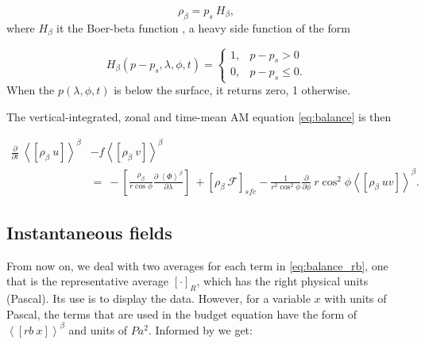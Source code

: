 \documentclass[11pt]{article}
\numberwithin{equation}{section}
\newcommand{\beq}{\begin{equation}}
\newcommand{\eeq}{\end{equation}}
\newcommand{\la}{\langle}
\newcommand{\ra}{\rangle}
\newcommand{\lara}[1]{\left\la{#1}\right\ra}
\newcommand{\cphi}{\cos \phi}
\newcommand{\rb}{\rho_\beta}
\begin{document}
$$\rb = p_s ~H_\beta,$$ 
where $H_\beta$ it the Boer-beta function \citep{Boer1982}, a heavy side function of the form 

\beq
H_\beta(p -p_s, \lambda, \phi, t)= 
    \begin{cases}  
      1, & p -p_s >  0 \\
      0, & p -p_s \leq 0.
    \end{cases}
\eeq
When the $p(\lambda, \phi, t)$ is below the surface, it returns zero, 1 otherwise.\par


The vertical-integrated, zonal and time-mean AM equation \eqref{eq:balance} is then 

\begin{align} \label{eq:balance_rb}
\frac{\partial}{\partial t}  ~ \lara{[\rb~u]}^\beta &- f \lara{ [\rb~v]}^\beta  \nonumber  \\
  &= ~ - \left[\frac{\rb }{r \cphi} \frac{\partial~\lara{\Phi}^\beta  }{\partial \lambda}  \right]
 ~+ [\rb ~ \mathcal{F}]_{sfc}  - \frac{1}{r^2 \cos^2{\phi}}  \frac{\partial}{\partial \phi}  ~ r \cos^2{\phi} \lara{ [ \rb ~u v] }^\beta.
\end{align}

\subsection{Instantaneous fields}
From now on, we deal with two averages for each term in \eqref{eq:balance_rb}, one that is the representative average $[\cdot]_R$, which has the right physical units (Pascal). Its use is to display the data. However, for a variable $x$ with units of Pascal, the terms that are used in the budget equation have the form of $\lara{[rb ~x ]}^\beta$ and units of $Pa^2$. Informed by \citet[Table 1,][]{Boer1982} we get:
\end{document}
